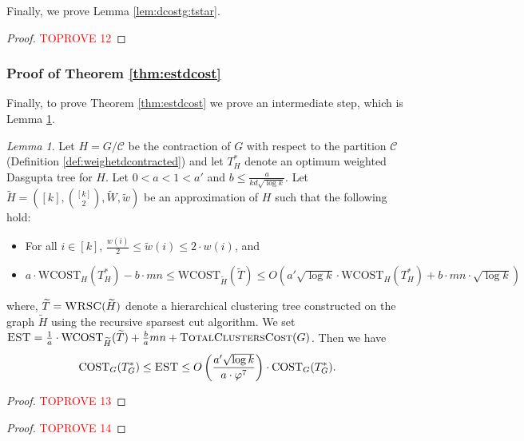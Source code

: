 \documentclass[letterpaper,11pt]{article}
\newcommand{\CT}{\text{COST}}
\newcommand{\wCT}{\text{WCOST}}
\newcommand{\estg}{\textsc{EST}}
\newcommand{\cC}{\mathcal{C}}
\theoremstyle{plain}
\theoremstyle{definition}
\theoremstyle{remark}
\newtheorem{lemmma}{Lemma}
\newcommand{\wt}[1]{\widetilde{#1}}
\begin{document}
Finally, we prove Lemma \ref{lem:dcostg:tstar}. 
\optcost*

\begin{proof}\textcolor{red}{TOPROVE 12}\end{proof}






\subsubsection{Proof of Theorem \ref{thm:estdcost}} \label{sec:proof:prepros}

Finally, to prove Theorem \ref{thm:estdcost}  we prove an intermediate step, which is Lemma \ref{lem:general:apx:cost}.


\begin{lemmma} \label{lem:general:apx:cost}
	Let $H = G/\cC$ be the contraction of $G$ with respect to the partition $\cC $ (Definition \ref{def:weighetdcontracted}) 
	and let $T^*_H$ denote an optimum weighted Dasgupta tree for $H$. Let $0 < a < 1 < a'$ and 
	$b \leq  \frac{a}{k d \sqrt{\log k}}$. Let  
	$\widetilde{H}= \left([k], {[k] \choose 2}, \widetilde{W}, \widetilde{w}\right)$ 
	be an approximation of $H$ such that the following hold: 

	\begin{itemize}[leftmargin=*]
		\item For all $i\in[k]$, $ \frac{w(i)}{2}\leq \wt{w}(i) \leq 2 \cdot w(i)$, and 
		\item $a \cdot \wCT_{H}(T^*_{H}) - b \cdot mn \leq \wCT_{\wt{H}}(\widetilde{T}) \leq O\left(a' \sqrt{\log k} \cdot \wCT_{H}(T^*_{H}) + b \cdot mn \cdot \sqrt{\log k}\right)$
	\end{itemize}
	where, $\widetilde{T} = \textsc{WRSC}(\widetilde{H})$ denote a hierarchical clustering tree constructed on the 
	graph $\widetilde{H}$ using the recursive sparsest cut algorithm.
	We set $\estg = \frac{1}{a} \cdot \wCT_{\wt{H}}(\wt{T}) + \frac{b}{a} mn + \textsc{TotalClustersCost}(G)$.
	Then we have
	\[\CT_G(T^*_G) \leq \estg \leq O\left(\frac{a'\sqrt{\log k}}{a\cdot \varphi^7}\right)\cdot \CT_G(T^*_G)\text{.}\]
\end{lemmma}


\begin{proof}\textcolor{red}{TOPROVE 13}\end{proof}

\thmestdcost*


\begin{proof}\textcolor{red}{TOPROVE 14}\end{proof}
\end{document}
